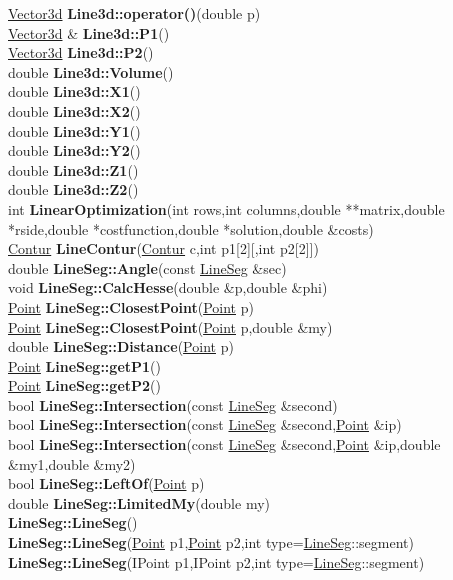 \documentclass[10pt,titlepage]{article}
\def\functionlistentry#1#2#3#4#5#6{\noindent #1 {\bf #2}(#3) \dotfill #6\\}
\begin{document}
{{\functionlistentry{\hyperlink{Vector3d}{Vector3d}}{Line3d::operator()}{double p}{677}{geoObject3d}{}
\functionlistentry{\hyperlink{Vector3d}{Vector3d} \&}{Line3d::P1}{}{668}{geoObject3d}{}
\functionlistentry{\hyperlink{Vector3d}{Vector3d}}{Line3d::P2}{}{672}{geoObject3d}{}
\functionlistentry{double}{Line3d::Volume}{}{678}{geoObject3d}{}
\functionlistentry{double}{Line3d::X1}{}{665}{geoObject3d}{}
\functionlistentry{double}{Line3d::X2}{}{669}{geoObject3d}{}
\functionlistentry{double}{Line3d::Y1}{}{666}{geoObject3d}{}
\functionlistentry{double}{Line3d::Y2}{}{670}{geoObject3d}{}
\functionlistentry{double}{Line3d::Z1}{}{667}{geoObject3d}{}
\functionlistentry{double}{Line3d::Z2}{}{671}{geoObject3d}{}
\functionlistentry{int}{LinearOptimization}{int rows,int columns,double **matrix,double *rside,double *costfunction,double *solution,double \&costs}{1136}{matrixAlgebra}{}
\functionlistentry{\hyperlink{Contur}{Contur}}{LineContur}{\hyperlink{Contur}{Contur} c,int p1[2][,int p2[2]]}{1331}{graphics}{}
\functionlistentry{double}{LineSeg::Angle}{const \hyperlink{LineSeg}{LineSeg} \&sec}{570}{geoObject}{}
\functionlistentry{void}{LineSeg::CalcHesse}{double \&p,double \&phi}{566}{geoObject}{}
\functionlistentry{\hyperlink{Point}{Point}}{LineSeg::ClosestPoint}{\hyperlink{Point}{Point} p}{573}{geoObject}{}
\functionlistentry{\hyperlink{Point}{Point}}{LineSeg::ClosestPoint}{\hyperlink{Point}{Point} p,double \&my}{574}{geoObject}{}
\functionlistentry{double}{LineSeg::Distance}{\hyperlink{Point}{Point} p}{575}{geoObject}{}
\functionlistentry{\hyperlink{Point}{Point}}{LineSeg::getP1}{}{558}{geoObject}{}
\functionlistentry{\hyperlink{Point}{Point}}{LineSeg::getP2}{}{559}{geoObject}{}
\functionlistentry{bool}{LineSeg::Intersection}{const \hyperlink{LineSeg}{LineSeg} \&second}{576}{geoObject}{}
\functionlistentry{bool}{LineSeg::Intersection}{const \hyperlink{LineSeg}{LineSeg} \&second,\hyperlink{Point}{Point} \&ip}{577}{geoObject}{}
\functionlistentry{bool}{LineSeg::Intersection}{const \hyperlink{LineSeg}{LineSeg} \&second,\hyperlink{Point}{Point} \&ip,double \&my1,double \&my2}{578}{geoObject}{}
\functionlistentry{bool}{LineSeg::LeftOf}{\hyperlink{Point}{Point} p}{572}{geoObject}{}
\functionlistentry{double}{LineSeg::LimitedMy}{double my}{565}{geoObject}{}
\functionlistentry{}{LineSeg::LineSeg}{}{550}{geoObject}{}
\functionlistentry{}{LineSeg::LineSeg}{\hyperlink{Point}{Point} p1,\hyperlink{Point}{Point} p2,int type=\hyperlink{LineSeg}{LineSeg}::segment}{551}{geoObject}{}
\functionlistentry{}{LineSeg::LineSeg}{IPoint p1,IPoint p2,int type=\hyperlink{LineSeg}{LineSeg}::segment}{552}{geoObject}{}
}}
\end{document}
